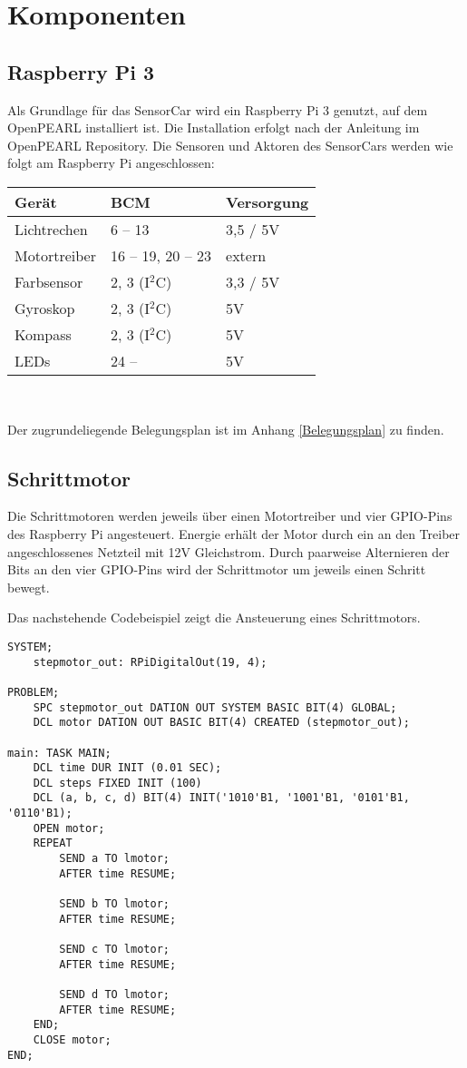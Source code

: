 \chapter{Komponenten}
\section{Raspberry Pi 3}
Als Grundlage für das SensorCar wird ein Raspberry Pi 3 genutzt, auf dem OpenPEARL installiert ist. Die Installation erfolgt nach der Anleitung im OpenPEARL Repository. Die Sensoren und Aktoren des SensorCars werden wie folgt am Raspberry Pi angeschlossen:

\begin{center}
\begin{tabular}{|l|l|l|}
	\hline
	\textbf{Gerät} & \textbf{BCM} & \textbf{Versorgung}\\
	\hline
	Lichtrechen & 6 -- 13 & 3,5 / 5V\\
	\hline
	Motortreiber& 16 -- 19, 20 -- 23 & extern\\
	\hline
	Farbsensor & 2, 3 (I$^2$C) & 3,3 / 5V\\
	\hline
	Gyroskop & 2, 3 (I$^2$C) & 5V\\
	\hline
	Kompass & 2, 3 (I$^2$C) & 5V\\
	\hline
	LEDs & 24 -- & 5V\\
	\hline
\end{tabular}\\
\end{center}
Der zugrundeliegende Belegungsplan ist im Anhang \ref{Belegungsplan} zu finden.


\section{Schrittmotor}
Die Schrittmotoren werden jeweils über einen Motortreiber und vier GPIO-Pins des Raspberry Pi angesteuert. Energie erhält der Motor durch ein an den Treiber angeschlossenes Netzteil mit 12V Gleichstrom. Durch paarweise Alternieren der Bits an den vier GPIO-Pins wird der Schrittmotor um jeweils einen Schritt bewegt. 

Das nachstehende Codebeispiel zeigt die Ansteuerung eines Schrittmotors.\\

\begin{lstlisting}
SYSTEM;
	stepmotor_out: RPiDigitalOut(19, 4);

PROBLEM;
	SPC stepmotor_out DATION OUT SYSTEM BASIC BIT(4) GLOBAL;
	DCL motor DATION OUT BASIC BIT(4) CREATED (stepmotor_out);

main: TASK MAIN;
	DCL time DUR INIT (0.01 SEC);
	DCL steps FIXED INIT (100)
	DCL (a, b, c, d) BIT(4) INIT('1010'B1, '1001'B1, '0101'B1, '0110'B1);
	OPEN motor;
	REPEAT
		SEND a TO lmotor;
		AFTER time RESUME;
		
		SEND b TO lmotor;
		AFTER time RESUME;
		
		SEND c TO lmotor;
		AFTER time RESUME;
		
		SEND d TO lmotor;
		AFTER time RESUME;
	END;
	CLOSE motor;
END;
\end{lstlisting}


